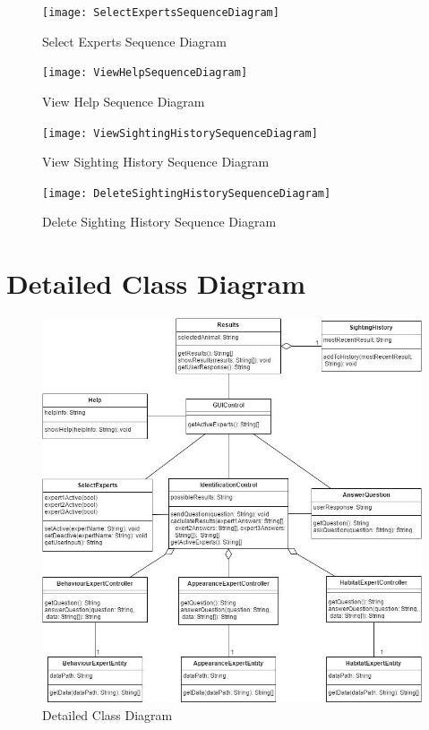 \documentclass[]{article}
\begin{document}
\begin{figure}[H]
	\centering
	\texttt{[image: SelectExpertsSequenceDiagram]}
	\caption{Select Experts Sequence Diagram}
	\label{Select Experts Sequence Diagram}
\end{figure}

\begin{figure}[H]
	\centering
	\texttt{[image: ViewHelpSequenceDiagram]}
	\caption{View Help Sequence Diagram}
	\label{View Help Sequence Diagram}
\end{figure}

\begin{figure}[H]
	\centering
	\texttt{[image: ViewSightingHistorySequenceDiagram]}
	\caption{View Sighting History Sequence Diagram}
	\label{View Sighting History Sequence Diagram}
\end{figure}

\begin{figure}[H]
	\centering
	\texttt{[image: DeleteSightingHistorySequenceDiagram]}
	\caption{Delete Sighting History Sequence Diagram}
	\label{Delete Sighting History Sequence Diagram}
\end{figure}


\section{Detailed Class Diagram}
\label{sec:detailed_class_diagram}
\begin{figure}[H]
	\centering
	\includegraphics[width = 14cm]{DetailedClassDiagram}
	\caption{Detailed Class Diagram}
	\label{Detailed Class Diagram}
\end{figure}
\end{document}
